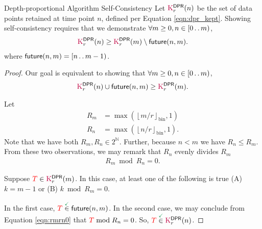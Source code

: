 \begin{theorem}{Depth-proportional Algorithm Self-Consistency}
\label{thm:depth-proportional-algo-self-consistency}
Let $\colorK^{\mathsf{DPR}}_r(n)$ be the set of data points retained at time point $n$, defined per Equation \ref{eqn:dpr_kept}.
Showing self-consistency requires that we demonstrate $\forall m \geq 0, n \in [0 \mathinner {\ldotp \ldotp} m)$,
\begin{align*}
\colorK^{\mathsf{DPR}}_r(n)
\geq
\colorK^{\mathsf{DPR}}_r(m)
\setminus
\mathsf{future}(n, m).
\end{align*}
where $\mathsf{future}(n, m) = [n \mathinner {\ldotp \ldotp} m - 1)$.
\end{theorem}

\begin{proof}
\label{prf:depth-proportional-algo-self-consistency}
Our goal is equivalent to showing that $\forall m \geq 0, n \in [0 \mathinner {\ldotp \ldotp} m)$,
\begin{align*}
\colorK^{\mathsf{DPR}}_r(n) \cup \mathsf{future}(n, m) \geq \colorK^{\mathsf{DPR}}_r(m).
\end{align*}

Let
\begin{align*}
R_m
&=
\max(\left\lfloor m / r \right\rfloor_{\mathrm{bin}}, 1)\\
R_n
&=
\max(\left\lfloor n / r \right\rfloor_{\mathrm{bin}}, 1).
\end{align*}
Note that we have both $R_m, R_n \in 2^{\mathbb{N}}$.
Further, because $n < m$ we have $R_n \leq R_m$.
From these two observations, we may remark that $R_n$ evenly divides $R_m$
\begin{align}
R_m \bmod R_n = 0.
\label{eqn:rmrn0}
\end{align}

Suppose $\colorTbar \in \colorK^{\mathsf{DPR}}_r(m)$.
In this case, at least one of the following is true (A) $k = m - 1$ or (B) $k \bmod R_m = 0$.

In the first case, $\colorTbar \stackrel{\checkmark}{\in} \mathsf{future}(n, m)$.
In the second case, we may conclude from Equation \ref{eqn:rmrn0} that $\colorTbar \bmod R_n = 0$.
So, $\colorTbar \stackrel{\checkmark}{\in} \colorK^{\mathsf{DPR}}_r(n)$.
\end{proof}
